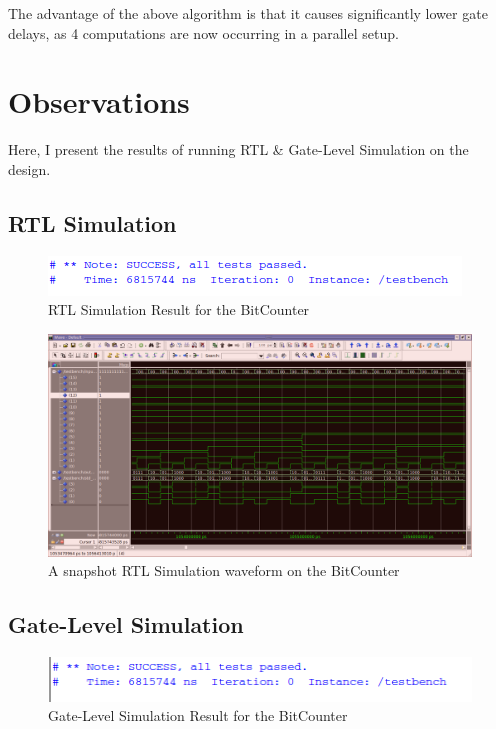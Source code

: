 \documentclass[a4paper, 11pt]{article}
\begin{document}
The advantage of the above algorithm is that it causes significantly lower gate delays, as 4 computations are now occurring in a parallel setup.

\section{Observations}
Here, I present the results of running RTL \& Gate-Level Simulation on the design.
\subsection{RTL Simulation}
\begin{figure}[H]
\centering
\includegraphics[scale=1]{RTL_Success}
\caption{RTL Simulation Result for the BitCounter}
\end{figure}

\begin{figure}[H]
\centering
\includegraphics[scale=0.33]{RTL}
\caption{A snapshot RTL Simulation waveform on the BitCounter}
\end{figure}


\subsection{Gate-Level Simulation}
\begin{figure}[H]
\centering
\includegraphics[scale=1]{Gate_Success}
\caption{Gate-Level Simulation Result for the BitCounter}
\end{figure}
\end{document}
